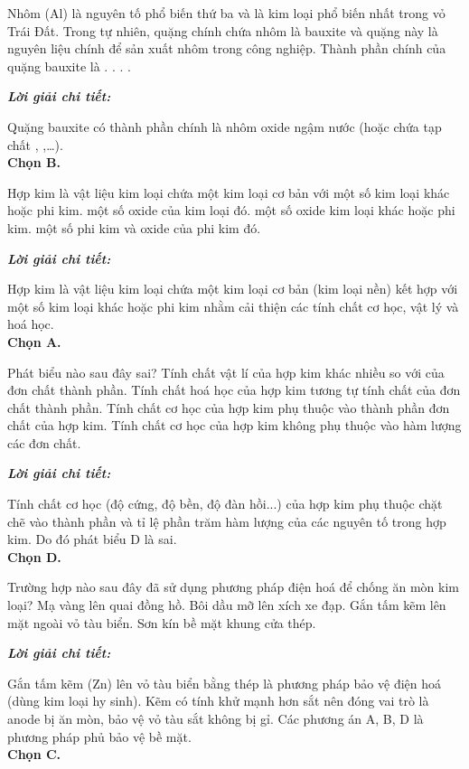 \documentclass[11pt,a4paper]{article}
\def\loigiai#1{
\par\begingroup\color{blue!80!black}\small
\noindent\textbf{\textit{Lời giải chi tiết:}}\par
#1\par\endgroup}
\begin{document}
\begin{ex}
Nhôm (Al) là nguyên tố phổ biến thứ ba và là kim loại phổ biến nhất trong vỏ Trái Đất. Trong tự nhiên, quặng chính chứa nhôm là bauxite và quặng này là nguyên liệu chính để sản xuất nhôm trong công nghiệp. Thành phần chính của quặng bauxite là
\choice
{.}
{\True {}.}
{.}
{.}
\loigiai{
Quặng bauxite có thành phần chính là nhôm oxide ngậm nước \ce{Al2O3.2H2O} (hoặc \ce{Al2O3.xH2O} chứa tạp chất \ce{Fe2O3}, \ce{SiO2},\dots).\\
\textbf{Chọn B.}}
\end{ex}

\begin{ex}
Hợp kim là vật liệu kim loại chứa một kim loại cơ bản với
\choice
{\True một số kim loại khác hoặc phi kim.}
{một số oxide của kim loại đó.}
{một số oxide kim loại khác hoặc phi kim.}
{một số phi kim và oxide của phi kim đó.}
\loigiai{
Hợp kim là vật liệu kim loại chứa một kim loại cơ bản (kim loại nền) kết hợp với một số kim loại khác hoặc phi kim nhằm cải thiện các tính chất cơ học, vật lý và hoá học.\\
\textbf{Chọn A.}}
\end{ex}

\begin{ex}
Phát biểu nào sau đây sai?
\choice
{Tính chất vật lí của hợp kim khác nhiều so với của đơn chất thành phần.}
{Tính chất hoá học của hợp kim tương tự tính chất của đơn chất thành phần.}
{Tính chất cơ học của hợp kim phụ thuộc vào thành phần đơn chất của hợp kim.}
{\True Tính chất cơ học của hợp kim không phụ thuộc vào hàm lượng các đơn chất.}
\loigiai{
Tính chất cơ học (độ cứng, độ bền, độ đàn hồi...) của hợp kim phụ thuộc chặt chẽ vào thành phần và tỉ lệ phần trăm hàm lượng của các nguyên tố trong hợp kim. Do đó phát biểu D là sai.\\
\textbf{Chọn D.}}
\end{ex}

\begin{ex}
Trường hợp nào sau đây đã sử dụng phương pháp điện hoá để chống ăn mòn kim loại?
\choice
{Mạ vàng lên quai đồng hồ.}
{Bôi dầu mỡ lên xích xe đạp.}
{\True Gắn tấm kẽm lên mặt ngoài vỏ tàu biển.}
{Sơn kín bề mặt khung cửa thép.}
\loigiai{
Gắn tấm kẽm (Zn) lên vỏ tàu biển bằng thép là phương pháp bảo vệ điện hoá (dùng kim loại hy sinh). Kẽm có tính khử mạnh hơn sắt nên đóng vai trò là anode bị ăn mòn, bảo vệ vỏ tàu sắt không bị gỉ. Các phương án A, B, D là phương pháp phủ bảo vệ bề mặt.\\
\textbf{Chọn C.}}
\end{ex}
\end{document}

